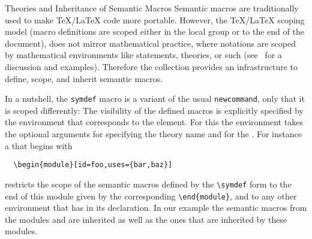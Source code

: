 \begin{tsubsection}{Theories and Inheritance of Semantic Macros}
  Semantic macros are traditionally used to make {\TeX/\LaTeX} code more
  portable. However, the {\TeX/\LaTeX} scoping model (macro definitions are scoped either
  in the local group or to the end of the document), does not mirror mathematical
  practice, where notations are scoped by mathematical environments like statements,
  theories, or such (see~\cite{Kohlhase:smtl05} for a discussion and examples). Therefore
  the {\stex} collection provides an infrastructure to define, scope, and inherit semantic
  macros.

  In a nutshell, the {\stex} {\verb|symdef|} macro is a variant of the usual
  {\verb|newcommand|}, only that it is scoped differently: The visibility of the defined
  macros is explicitly specified by the {} environment that corresponds to
  the {\omdoc} {} element.  For this the {} environment
  takes the optional {} arguments {} for specifying the theory
  name and {} for the {}. For
  instance a {} that begins with
\begin{lstlisting}
  \begin{module}[id=foo,uses={bar,baz}]
\end{lstlisting}
restricts the scope of the semantic macros defined by the {\verb|\symdef|} form to the end of
this module given by the corresponding {\verb|\end{module}|}, and to any other
{} environment that has {\snippet{[uses=\{\ldots,foo,\ldots\}]}} in its
declaration. In our example the semantic macros from the modules {}
and {} are inherited as well as the ones that are inherited by these modules.


\end{tsubsection}
